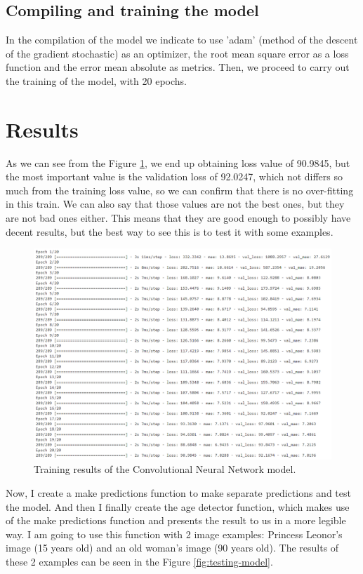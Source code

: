 \documentclass{article}
\begin{document}
\subsection{Compiling and training the model}
In the compilation of the model we indicate to use 'adam' (method of the descent of the gradient stochastic) as an optimizer, the root mean square error as a loss function and the error mean absolute as metrics.
Then, we proceed to carry out the training of the model, with 20 epochs.


\section{Results}

As we can see from the Figure \ref{fig:training-model}, we end up obtaining loss value of 90.9845, but the most important value is the validation loss of 92.0247, which not differs so much from the training loss value, so we can confirm that there is no over-fitting in this train. We can also say that those values are not the best ones, but they are not bad ones either. This means that they are good enough to possibly have decent results, but the best way to see this is to test it with some examples.

\begin{figure}[t]
\centering
\includegraphics[width=1\columnwidth]{training-model.png}
\caption{Training results of the Convolutional Neural Network model.\label{fig:training-model}}
\end{figure}

Now, I create a make predictions function to make separate predictions and test the model. And then I finally create the age detector function, which makes use of the make predictions function and presents the result to us in a more legible way. I am going to use this function with 2 image examples: Princess Leonor's image (15 years old) and an old woman's image (90 years old). The results of these 2 examples can be seen in the Figure \ref{fig:testing-model}.
\end{document}
